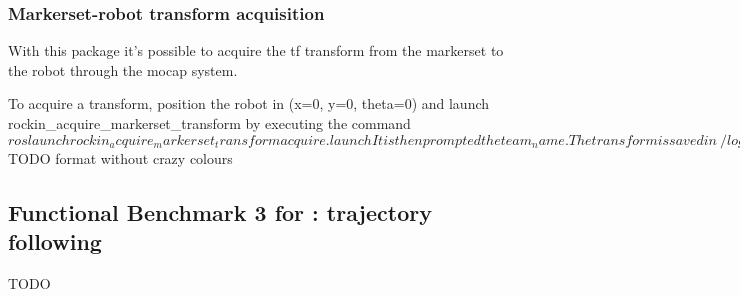 \documentclass[a4paper]{article}
\begin{document}
\subsubsection{Markerset-robot transform acquisition}

With this package it's possible to acquire the tf transform from the markerset to the robot through the mocap system.

To acquire a transform, position the robot in (x=0, y=0, theta=0) and launch rockin_acquire_markerset_transform by executing the command
$ roslaunch rockin_acquire_markerset_transform acquire.launch
It is then prompted the team_name.

The transform is saved in ~/logs/transform-<team_name>.yaml.

In rockin_acquire_markerset_transform/config/mocap.yaml there is the mocap cofiguration. It is not needed to configure this normally.


$ TODO format without crazy colours

\clearpage

\subsection{Functional Benchmark 3 for \ro@Work: trajectory following}
\label{sec:fbm3w}
TODO
\end{document}
